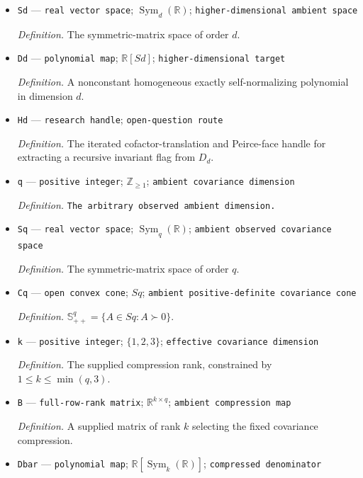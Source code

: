 \documentclass{article}
\begin{document}
\begin{itemize}
  \item \texttt{Sd} --- \texttt{real vector space}; \(\operatorname{Sym}_{d}(\mathbb R)\); \texttt{higher-\allowbreak{}dimensional ambient space}
  \par\smallskip\noindent\emph{Definition.} The symmetric-matrix space of order \(d\).
  \item \texttt{Dd} --- \texttt{polynomial map}; \(\mathbb R[Sd]\); \texttt{higher-\allowbreak{}dimensional target}
  \par\smallskip\noindent\emph{Definition.} A nonconstant homogeneous exactly self-normalizing polynomial in dimension \(d\).
  \item \texttt{Hd} --- \texttt{research handle}; \texttt{open-\allowbreak{}question route}
  \par\smallskip\noindent\emph{Definition.} The iterated cofactor-translation and Peirce-face handle for extracting a recursive invariant flag from \(D_d\).
  \item \texttt{q} --- \texttt{positive integer}; \(\mathbb Z_{\geq1}\); \texttt{ambient covariance dimension}
  \par\smallskip\noindent\emph{Definition.} \texttt{The arbitrary observed ambient dimension.}
  \item \texttt{Sq} --- \texttt{real vector space}; \(\operatorname{Sym}_{q}(\mathbb R)\); \texttt{ambient observed covariance space}
  \par\smallskip\noindent\emph{Definition.} The symmetric-matrix space of order \(q\).
  \item \texttt{Cq} --- \texttt{open convex cone}; \(Sq\); \texttt{ambient positive-\allowbreak{}definite covariance cone}
  \par\smallskip\noindent\emph{Definition.} \(\mathbb S_{++}^{q}=\{A\in Sq:A\succ0\}\).
  \item \texttt{k} --- \texttt{positive integer}; \(\{1,2,3\}\); \texttt{effective covariance dimension}
  \par\smallskip\noindent\emph{Definition.} The supplied compression rank, constrained by \(1\leq k\leq\min(q,3)\).
  \item \texttt{B} --- \texttt{full-\allowbreak{}row-\allowbreak{}rank matrix}; \(\mathbb R^{k\times q}\); \texttt{ambient compression map}
  \par\smallskip\noindent\emph{Definition.} A supplied matrix of rank \(k\) selecting the fixed covariance compression.
  \item \texttt{Dbar} --- \texttt{polynomial map}; \(\mathbb R[\operatorname{Sym}_{k}(\mathbb R)]\); \texttt{compressed denominator}

\end{itemize}
\end{document}
